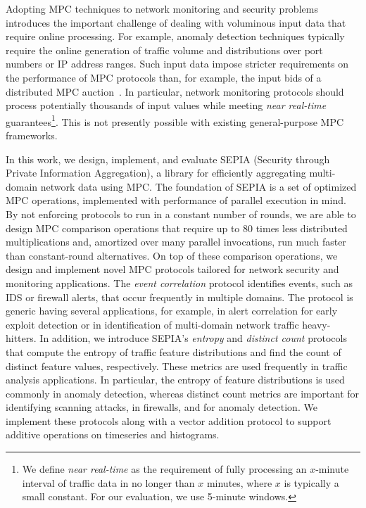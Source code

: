 \documentclass[letterpaper,11pt,onecolumn,titlepage]{article}
\begin{document}
Adopting MPC techniques to network monitoring and security problems
introduces the important challenge of dealing with voluminous input
data that require online processing. For example, anomaly detection
techniques typically require the online generation of traffic volume
and distributions over port numbers or IP address ranges. Such input
data impose stricter requirements on the performance of MPC protocols
than, for example, the input bids of a distributed MPC
auction~\cite{bogetoft2009secure}.  In particular, network monitoring
protocols should process potentially thousands of input values while
meeting {\it near real-time} guarantees\footnote{We define {\it near
real-time} as the requirement of fully processing an $x$-minute
interval of traffic data in no longer than $x$ minutes, where $x$ is typically
a small constant. For our evaluation, we use 5-minute windows.}. This is not
presently possible with existing general-purpose MPC frameworks.

In this work, we design, implement, and evaluate SEPIA (Security
through Private Information Aggregation), a library for
efficiently aggregating multi-domain network data using MPC. 
The foundation of SEPIA is a set of optimized MPC operations, implemented
with performance of parallel execution in mind.
By not enforcing protocols to run in a constant number of rounds, 
we are able to design MPC comparison operations that require up to 80 times
less distributed multiplications and, amortized over many parallel invocations, 
run much faster than constant-round alternatives. 
On top of these comparison operations, we
design and implement novel MPC protocols tailored for network
security and monitoring applications. The {\it event correlation}
protocol identifies events, such as IDS or firewall alerts, that occur
frequently in multiple domains.  The protocol is generic having
several applications, for example, in alert correlation for early
exploit detection or in identification of multi-domain network traffic
heavy-hitters. In addition, we introduce SEPIA's {\it entropy} and
{\it distinct count} protocols that compute the entropy of traffic
feature distributions and find the count of distinct feature values,
respectively. These metrics are used frequently in traffic analysis
applications.  In particular, the entropy of feature distributions is
used commonly in anomaly detection, whereas distinct count metrics are
important for identifying scanning attacks, in firewalls, and for
anomaly detection. We implement these protocols along with a
vector addition protocol to support additive
operations on timeseries and histograms.
\end{document}

